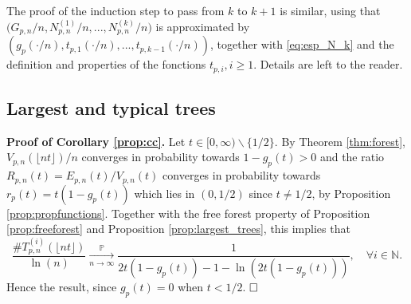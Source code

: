 \documentclass[a4, 11pt]{article}
\numberwithin{equation}{section}
\theoremstyle{plain}
\theoremstyle{definition}
\theoremstyle{remark}
\begin{document}
The proof of the induction step to pass from $k$ to $k+1$ is similar, using that $\big(G_{p,n}/n,N_{p,n}^{(1)}/n,...,N_{p,n}^{(k)}/n\big)$ is approximated by $\left(g_p\left(\cdot/n\right),t_{p,1}\left(\cdot /n\right),...,t_{p,k-1}\left(\cdot/n\right)\right)$, together with \eqref{eq:esp_N_k} and the definition and properties of the fonctions $t_{p,i}, i \geq 1$. Details are left to the reader.

\subsection{Largest and typical trees}
\label{sec:typ_L_trees}

\textbf{Proof of Corollary \ref{prop:cc}.} Let $t\in [0,\infty) \backslash \{1/2\}$. By  Theorem \ref{thm:forest}, $V_{p,n}(\lfloor nt \rfloor)/n$ converges in probability towards $1-g_p(t)>0$ and the ratio $R_{p,n}(t)=E_{p,n}(t)/V_{p,n}(t)$ converges in probability  towards $r_p(t)=t(1-g_p(t))$ which lies in $(0,1/2)$ since $t \neq 1/2$, by Proposition \ref{prop:propfunctions}. Together with the free forest property of Proposition \ref{prop:freeforest} and Proposition \ref{prop:largest_trees}, this implies that 
$$
\frac{\# T^{(i)}_{p,n}(\lfloor nt \rfloor)}{\ln(n)} \underset{n \rightarrow \infty}{\overset{\mathbb P}\longrightarrow} \frac{1}{2t(1-g_p(t))-1-\ln(2t(1-g_p(t)))}, \quad \forall i \in \mathbb N.
$$
Hence the result, since $g_p(t)=0$ when $t<1/2$.
$\hfill \square$

\bigskip
\end{document}
